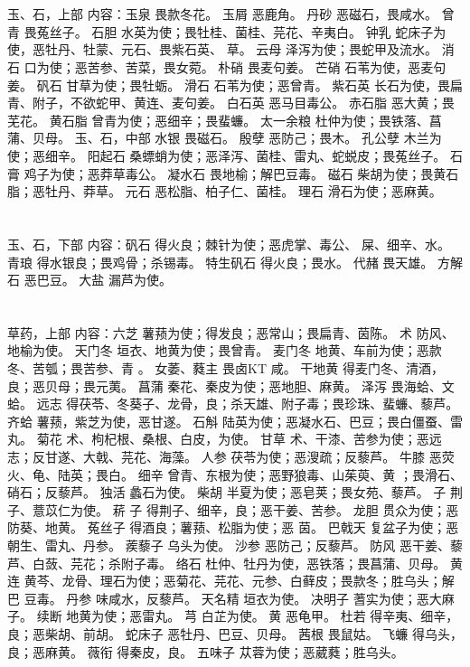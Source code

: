 \documentclass[12pt,UTF8]{ctexbook}
\begin{document}
\section{}玉、石，上部
内容：玉泉 畏款冬花。 
玉屑 恶鹿角。 
丹砂 恶磁石，畏咸水。 
曾青 畏菟丝子。 
石胆 水英为使；畏牡桂、菌桂、芫花、辛夷白。 
钟乳 蛇床子为使，恶牡丹、牡蒙、元石、畏紫石英、 草。 
云母 泽泻为使；畏蛇甲及流水。 
消石 口为使；恶苦参、苦菜，畏女菀。 
朴硝 畏麦句姜。 
芒硝 石苇为使，恶麦句姜。 
矾石 甘草为使；畏牡蛎。 
滑石 石苇为使；恶曾青。 
紫石英 长石为使，畏扁青、附子，不欲蛇甲、黄连、麦句姜。 
白石英 恶马目毒公。 
赤石脂 恶大黄；畏芜花。 
黄石脂 曾青为使；恶细辛；畏蜚蠊。 
太一余粮 杜仲为使；畏铁落、菖蒲、贝母。 
玉、石，中部 
水银 畏磁石。 
殷孽 恶防己；畏木。 
孔公孽 木兰为使；恶细辛。 
阳起石 桑螵蛸为使；恶泽泻、菌桂、雷丸、蛇蜕皮；畏菟丝子。 
石膏 鸡子为使；恶莽草毒公。 
凝水石 畏地榆；解巴豆毒。 
磁石 柴胡为使；畏黄石脂；恶牡丹、莽草。 
元石 恶松脂、柏子仁、菌桂。 
理石 滑石为使；恶麻黄。 


\section{}玉、石，下部
内容：矾石 得火良；棘针为使；恶虎掌、毒公、 屎、细辛、水。 
青琅 得水银良；畏鸡骨；杀锡毒。 
特生矾石 得火良；畏水。 
代赭 畏天雄。 
方解石 恶巴豆。 
大盐 漏芦为使。 


\section{}草药，上部
内容：六芝 薯蓣为使；得发良；恶常山；畏扁青、茵陈。 
术 防风、地榆为使。 
天门冬 垣衣、地黄为使；畏曾青。 
麦门冬 地黄、车前为使；恶款冬、苦瓠；畏苦参、青 。 
女萎、蕤主 畏卤KT 咸。 
干地黄 得麦门冬、清酒，良；恶贝母；畏元荑。 
菖蒲 秦花、秦皮为使；恶地胆、麻黄。 
泽泻 畏海蛤、文蛤。 
远志 得茯苓、冬葵子、龙骨，良；杀天雄、附子毒；畏珍珠、蜚蠊、藜芦。 
齐蛤 薯蓣，紫芝为使，恶甘遂。 
石斛 陆英为使；恶凝水石、巴豆；畏白僵蚕、雷丸。 
菊花 术、枸杞根、桑根、白皮，为使。 
甘草 术、干漆、苦参为使；恶远志；反甘遂、大戟、芫花、海藻。 
人参 茯苓为使；恶溲疏；反藜芦。 
牛膝 恶荧火、龟、陆英；畏白。 
细辛 曾青、东根为使；恶野狼毒、山茱萸、黄 ；畏滑石、硝石；反藜芦。 
独活 蠡石为使。 
柴胡 半夏为使；恶皂荚；畏女苑、藜芦。 
子 荆子、薏苡仁为使。 
菥 子 得荆子、细辛，良；恶干姜、苦参。 
龙胆 贯众为使；恶防葵、地黄。 
菟丝子 得酒良；薯蓣、松脂为使；恶 茵。 
巴戟天 复盆子为使；恶朝生、雷丸、丹参。 
蒺藜子 乌头为使。 
沙参 恶防己；反藜芦。 
防风 恶干姜、藜芦、白蔹、芫花；杀附子毒。 
络石 杜仲、牡丹为使，恶铁落；畏菖蒲、贝母。 
黄连 黄芩、龙骨、理石为使；恶菊花、芫花、元参、白藓皮；畏款冬；胜乌头；解巴 
豆毒。 
丹参 味咸水，反藜芦。 
天名精 垣衣为使。 
决明子 蓍实为使；恶大麻子。 
续断 地黄为使；恶雷丸。 
芎 白芷为使。 
黄 恶龟甲。 
杜若 得辛夷、细辛，良；恶柴胡、前胡。 
蛇床子 恶牡丹、巴豆、贝母。 
茜根 畏鼠姑。 
飞蠊 得乌头，良；恶麻黄。 
薇衔 得秦皮，良。 
五味子 苁蓉为使；恶葳蕤；胜乌头。 
\end{document}
